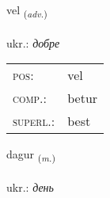 \documentclass[frontgrid, backgrid]{flacards}\usepackage[]{graphicx}\usepackage[]{xcolor}
\begin{document}
\renewcommand{\blhead}{\vskip5pt {\small\bfseries\footnotesize Atviksorð | прислівник }}
\renewcommand{\bcfoot}{\vskip5pt \hspace{2pt}{\small\bfseries\footnotesize 1K}}


{vel \small{\textsubscript{(\textit{adv.})}} \\[1ex] %
\textphonetic{[vɛːl]} \\
ukr.: \emph{добре} \\  [2ex]
\renewcommand*{\arraystretch}{0.8}
\begin{tabular}{ll}
\textsc{pos}: & vel \\ 
\textsc{comp.}: & betur \\ 
\textsc{superl.}: & best \\
\end{tabular}
}

\renewcommand{\flhead}{\vskip5pt \fboxsep=0pt {\small\bfseries\footnotesize Nafnorð | іменник}}
\renewcommand{\fcfoot}{\vskip5pt \fboxsep=0pt \hspace{2pt}{\small\bfseries\footnotesize 1K}}

\renewcommand{\blhead}{\vskip5pt {\small\bfseries\footnotesize Nafnorð | іменник }}
\renewcommand{\bcfoot}{\vskip5pt \hspace{2pt}{\small\bfseries\footnotesize 1K}}


{dagur \small{\textsubscript{(\textit{m.})}} \\[1ex] %
\textphonetic{[taːɣʏr]} \\
ukr.: \emph{день} \\  [2ex]
\renewcommand*{\arraystretch}{0.8}
}


\renewcommand{\flhead}{\vskip5pt \fboxsep=0pt {\small\bfseries\footnotesize Samtenging | сполучник}}
\renewcommand{\fcfoot}{\vskip5pt \fboxsep=0pt \hspace{2pt}{\small\bfseries\footnotesize 1K}}
\end{document}
